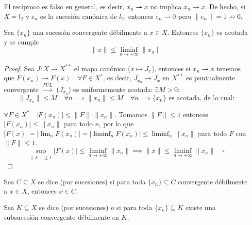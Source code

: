 \begin{observacion}
    El recíproco es falso en general, es decir, $x_n \rightharpoonup x$ no implica $x_n \longrightarrow x$. De hecho, si $X = l_2$ y $e_n$ es la sucesión canónica de $l_2$, entonces $e_n \rightharpoonup 0$ pero $\|e_n\| = 1 \not\to 0$.
\end{observacion}


\begin{prop}
    Sea $\{x_n\}$ una sucesión convergente débilmente a $x \in X$. Entonces $\{x_n\}$ es acotada y se cumple
    \begin{equation*}
        \|x\| \le \liminf_{n \to +\infty} \|x_n\|
    \end{equation*}
\begin{proof}
    Sea $J: X \longrightarrow X^{**}$ el mapa canónico ($x \mapsto J_x$), entonces si $x_n \rightharpoonup x$ tenemos que $F(x_n) \to F(x) \quad \forall F \in X^*$, es decir,
    $J_{x_n} \longrightarrow J_x$ en $X^{**}$ es puntualmente convergente $\xrightarrow{PUL}$ ($J_{x_n}$) es uniformemente acotada: $\exists M > 0 :$
    \begin{equation*}
        \|J_{x_n}\| \le M \quad \forall n \implies \|x_n\| \le M \quad \forall n \implies \{x_n\} \text{ es acotada, de lo cual:}
    \end{equation*}

    $\forall F \in X^* \quad |F(x_n)| \le \|F\| \cdot \|x_n\|$. Tomamos $\|F\| \le 1$ entonces $|F(x_n)| \le \|x_n\|$ para todo $n$, por lo que $|F(x)| = |\lim_{n} F(x_n)| = |\liminf_{n} F(x_n)| \le \liminf_n \|x_n\|$ para todo $F$ con $\|F\| \le 1$.
    \begin{equation*}
        \sup_{\|F\| \le 1} |F(x)| \le \liminf_{n \to +\infty} \|x_n\| \implies \|x\| \le \liminf_{n \to +\infty} \|x_n\| \quad \square
    \end{equation*}
\end{proof}
\end{prop}

\begin{definicion}
    Sea $C\subseteq X$ se dice  (por sucesiones) si para toda $\{x_n\} \subseteq C$ convergente débilmente a $x \in X$, entonces $x \in C$.
\end{definicion}

\begin{definicion}
    Sea $K\subseteq X$ se dice  (por sucesiones) o  si para toda $\{x_n\} \subseteq K$ existe una subsucesión convergente débilmente en $K$.
\end{definicion}

